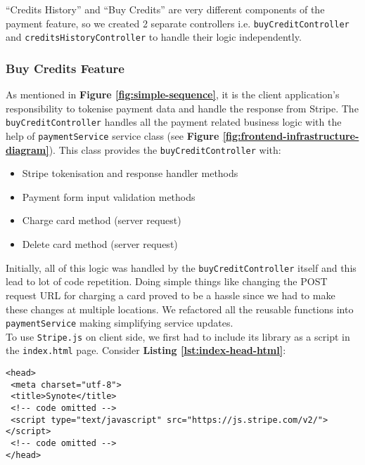 “Credits History” and “Buy Credits” are very different components of the payment feature, so we created 2 separate controllers i.e. \texttt{buyCreditController} and \texttt{creditsHistoryController} to handle their logic independently.

\subsubsection{Buy Credits Feature}
\label{subsubsec:buy-credits-feature}

As mentioned in \textbf{Figure \ref{fig:simple-sequence}}, it is the client application's responsibility to tokenise payment data and handle the response from Stripe. The \texttt{buyCreditController} handles all the payment related business logic with the help of \texttt{paymentService} service class (see \textbf{Figure \ref{fig:frontend-infrastructure-diagram}}). This class provides the \texttt{buyCreditController} with:

\begin{itemize}
\item Stripe tokenisation and response handler methods
\item Payment form input validation methods
\item Charge card method (server request)
\item Delete card method (server request)
\end{itemize}

Initially, all of this logic was handled by the \texttt{buyCreditController} itself and this lead to lot of code repetition. Doing simple things like changing the POST request URL for charging a card proved to be a hassle since we had to make these changes at multiple locations. We refactored all the reusable functions into \texttt{paymentService} making simplifying service updates. \\

To use \texttt{Stripe.js} on client side, we first had to include its library as a script in the \texttt{index.html} page. Consider \textbf{Listing \ref{lst:index-head-html}}:\\

\begin{listing}[H]
\begin{verbatim}
<head>
 <meta charset="utf-8">
 <title>Synote</title>
 <!-- code omitted -->
 <script type="text/javascript" src="https://js.stripe.com/v2/"></script>
 <!-- code omitted -->
</head>
\end{verbatim}
\label{lst:index-head-html}
\end{listing}

